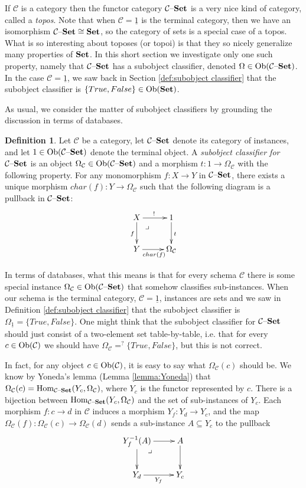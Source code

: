 \documentclass{book}
\makeatletter
\def\tn{\textnormal}
\def\mc{\mathcal}
\def\Hom{\tn{Hom}}
\def\Ob{\tn{Ob}}
\def\to{\rightarrow}
\def\taking{\colon}
\def\ss{\subseteq}
\def\iso{\cong}
\def\m1{{-1}}
\def\ul{\underline}
\def\ullimit{\ar@{}[rd]|(.3)*+{\lrcorner}}
\def\Set{{\bf Set}}
\def\set{{\text \textendash}{\bf Set}}
\def\mcC{\mc{C}}
\theoremstyle{remark}
\theoremstyle{definition}
\newtheorem{definition}[subsubsection]{Definition}
\makeatother
\begin{document}
If $\mcC$ is a category then the functor category $\mcC\set$ is a very nice kind of category, called a {\em topos}. Note that when $\mcC=\ul{1}$ is the terminal category, then we have an isomorphism $\mcC\set\iso\Set$, so the category of sets is a special case of a topos. What is so interesting about toposes (or topoi) is that they so nicely generalize many properties of $\Set$. In this short section we investigate only one such property, namely that $\mcC\set$ has a subobject classifier, denoted $\Omega\in\Ob(\mcC\set)$. In the case $\mcC=\ul{1}$, we saw back in Section \ref{def:subobject classifier} that the subobject classifier is $\{True,False\}\in\Ob(\Set)$. 

As usual, we consider the matter of subobject classifiers by grounding the discussion in terms of databases.

\begin{definition}

Let $\mcC$ be a category, let $\mcC\set$ denote its category of instances, and let $1\in\Ob(\mcC\set)$ denote the terminal object. A {\em subobject classifier for $\mcC\set$} is an object $\Omega_\mcC\in\Ob(\mcC\set)$ and a morphism $t\taking 1\to\Omega_\mcC$ with the following property. For any monomorphism $f\taking X\to Y$ in $\mcC\set$, there exists a unique morphism $char(f)\taking Y\to\Omega_\mcC$ such that the following diagram is a pullback in $\mcC\set$:
$$
\xymatrix@=25pt{X\ar[r]^{!}\ar[d]_f\ullimit&1\ar[d]^t\\Y\ar[r]_{char(f)}&\Omega_\mcC
}
$$

\end{definition}

In terms of databases, what this means is that for every schema $\mcC$ there is some special instance $\Omega_\mcC\in\Ob(\mcC\set)$ that somehow classifies sub-instances. When our schema is the terminal category, $\mcC=\ul{1}$, instances are sets and we saw in Definition \ref{def:subobject classifier} that the subobject classifier is $\Omega_{\ul{1}}=\{True, False\}$. One might think that the subobject classifier for $\mcC\set$ should just consist of a two-element set table-by-table, i.e. that for every $c\in\Ob(\mcC)$ we should have $\Omega_{\mcC}=^?\{True,False\}$, but this is not correct. 

In fact, for any object $c\in\Ob(\mcC)$, it is easy to say what $\Omega_\mcC(c)$ should be. We know by Yoneda's lemma (Lemma \ref{lemma:Yoneda}) that $\Omega_\mcC(c)=\Hom_{\mcC\set}(Y_c,\Omega_\mcC)$, where $Y_c$ is the functor represented by $c$. There is a bijection between $\Hom_{\mcC\set}(Y_c,\Omega_\mcC)$ and the set of sub-instances of $Y_c$. Each morphism $f\taking c\to d$ in $\mcC$ induces a morphism $Y_f\taking Y_d\to Y_c$, and the map $\Omega_\mcC(f)\taking\Omega_\mcC(c)\to\Omega_\mcC(d)$ sends a sub-instance $A\ss Y_c$ to the pullback 
$$
\xymatrix{Y_f^\m1(A)\ar[r]\ar[d]\ullimit&A\ar[d]\\Y_d\ar[r]_{Y_f}&Y_c}
$$
\end{document}
